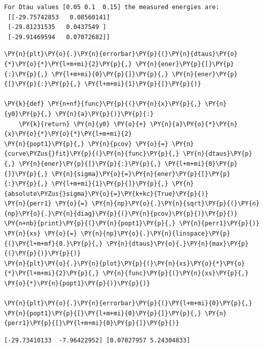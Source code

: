     \begin{Verbatim}[commandchars=\\\{\}]
For Dtau values [0.05 0.1  0.15] the measured energies are:
 [[-29.75742853   0.08560141]
 [-29.81231535   0.0437549 ]
 [-29.91469594   0.07072682]]
    \end{Verbatim}

    \begin{tcolorbox}[breakable, size=fbox, boxrule=1pt, pad at break*=1mm,colback=cellbackground, colframe=cellborder]
\begin{Verbatim}[commandchars=\\\{\}]
\PY{n}{plt}\PY{o}{.}\PY{n}{errorbar}\PY{p}{(}\PY{n}{dtaus}\PY{o}{*}\PY{o}{*}\PY{l+m+mi}{2}\PY{p}{,} \PY{n}{ener}\PY{p}{[}\PY{p}{:}\PY{p}{,} \PY{l+m+mi}{0}\PY{p}{]}\PY{p}{,} \PY{n}{ener}\PY{p}{[}\PY{p}{:}\PY{p}{,} \PY{l+m+mi}{1}\PY{p}{]}\PY{p}{)}

\PY{k}{def} \PY{n+nf}{func}\PY{p}{(}\PY{n}{x}\PY{p}{,} \PY{n}{y0}\PY{p}{,} \PY{n}{a}\PY{p}{)}\PY{p}{:}
    \PY{k}{return} \PY{n}{y0} \PY{o}{+} \PY{n}{a}\PY{o}{*}\PY{n}{x}\PY{o}{*}\PY{o}{*}\PY{l+m+mi}{2}
\PY{n}{popt1}\PY{p}{,} \PY{n}{pcov} \PY{o}{=} \PY{n}{curve\PYZus{}fit}\PY{p}{(}\PY{n}{func}\PY{p}{,} \PY{n}{dtaus}\PY{p}{,} \PY{n}{ener}\PY{p}{[}\PY{p}{:}\PY{p}{,} \PY{l+m+mi}{0}\PY{p}{]}\PY{p}{,} \PY{n}{sigma}\PY{o}{=}\PY{n}{ener}\PY{p}{[}\PY{p}{:}\PY{p}{,} \PY{l+m+mi}{1}\PY{p}{]}\PY{p}{,} \PY{n}{absolute\PYZus{}sigma}\PY{o}{=}\PY{k+kc}{True}\PY{p}{)}
\PY{n}{perr1} \PY{o}{=} \PY{n}{np}\PY{o}{.}\PY{n}{sqrt}\PY{p}{(}\PY{n}{np}\PY{o}{.}\PY{n}{diag}\PY{p}{(}\PY{n}{pcov}\PY{p}{)}\PY{p}{)}
\PY{n+nb}{print}\PY{p}{(}\PY{n}{popt1}\PY{p}{,} \PY{n}{perr1}\PY{p}{)}
\PY{n}{xs} \PY{o}{=} \PY{n}{np}\PY{o}{.}\PY{n}{linspace}\PY{p}{(}\PY{l+m+mf}{0.}\PY{p}{,} \PY{n}{dtaus}\PY{o}{.}\PY{n}{max}\PY{p}{(}\PY{p}{)}\PY{p}{)}
\PY{n}{plt}\PY{o}{.}\PY{n}{plot}\PY{p}{(}\PY{n}{xs}\PY{o}{*}\PY{o}{*}\PY{l+m+mi}{2}\PY{p}{,} \PY{n}{func}\PY{p}{(}\PY{n}{xs}\PY{p}{,} \PY{o}{*}\PY{n}{popt1}\PY{p}{)}\PY{p}{)}

\PY{n}{plt}\PY{o}{.}\PY{n}{errorbar}\PY{p}{(}\PY{l+m+mi}{0}\PY{p}{,} \PY{n}{popt1}\PY{p}{[}\PY{l+m+mi}{0}\PY{p}{]}\PY{p}{,} \PY{n}{perr1}\PY{p}{[}\PY{l+m+mi}{0}\PY{p}{]}\PY{p}{)}
\end{Verbatim}
\end{tcolorbox}

    \begin{Verbatim}[commandchars=\\\{\}]
[-29.73410133  -7.96422952] [0.07027957 5.24304833]
    \end{Verbatim}


